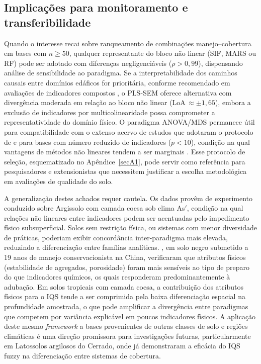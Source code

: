 \documentclass[pdflatex,sn-basic]{sn-jnl}%
\begin{document}
\subsection{Implicações para monitoramento e transferibilidade}\label{subsec:implications}

Quando o interesse recai sobre ranqueamento de combinações manejo--cobertura em bases com $n \geq 50$, qualquer representante do bloco não linear (SIF, MARS ou RF) pode ser adotado com diferenças negligenciáveis ($\rho > 0{,}99$), dispensando análise de sensibilidade ao paradigma. Se a interpretabilidade dos caminhos causais entre domínios edáficos for prioritária, conforme recomendado em avaliações de indicadores compostos \cite{Cardoso2013}, o PLS-SEM oferece alternativa com divergência moderada em relação ao bloco não linear (LoA\,$\approx \pm 1{,}65$), embora a exclusão de indicadores por multicolinearidade possa comprometer a representatividade do domínio físico. O paradigma ANOVA/MDS permanece útil para compatibilidade com o extenso acervo de estudos que adotaram o protocolo de \cite{Andrews2002} e para bases com número reduzido de indicadores ($p < 10$), condição na qual vantagens de métodos não lineares tendem a ser marginais \cite{Bünemann2018}. Esse protocolo de seleção, esquematizado no Apêndice~\ref{secA1}, pode servir como referência para pesquisadores e extensionistas que necessitem justificar a escolha metodológica em avaliações de qualidade do solo.

A generalização destes achados requer cautela. Os dados provêm de experimento conduzido sobre Argissolo com camada coesa \cite{LimaNeto2010} sob clima As$'$, condição na qual relações não lineares entre indicadores podem ser acentuadas pelo impedimento físico subsuperficial. Solos sem restrição física, ou sistemas com menor diversidade de práticas, poderiam exibir concordância inter-paradigma mais elevada, reduzindo a diferenciação entre famílias analíticas. \cite{Zhao2022}, em solo negro submetido a 19 anos de manejo conservacionista na China, verificaram que atributos físicos (estabilidade de agregados, porosidade) foram mais sensíveis ao tipo de preparo do que indicadores químicos, os quais responderam predominantemente à adubação. Em solos tropicais com camada coesa, a contribuição dos atributos físicos para o IQS tende a ser comprimida pela baixa diferenciação espacial na profundidade amostrada, o que pode amplificar a divergência entre paradigmas que competem por variância explicável em poucos indicadores físicos. A aplicação deste mesmo \textit{framework} a bases provenientes de outras classes de solo e regiões climáticas é uma direção promissora para investigações futuras, particularmente em Latossolos argilosos do Cerrado, onde \cite{DosSantos2021} já demonstraram a eficácia do IQS fuzzy na diferenciação entre sistemas de cobertura.
\end{document}
